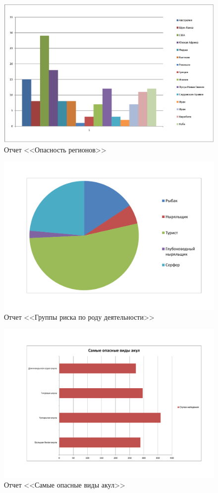 \documentclass[russian,utf8,simple,emptystyle]{eskdtext}
\begin{document}
\begin{figure}[ht]
\centering
\includegraphics[width=\textwidth, angle=90]{report1}
\caption{Отчет <<Опасность регионов>>}
\end{figure}

\begin{figure}[ht]
\centering
\includegraphics[width=\textwidth, angle=90]{report2}
\caption{Отчет <<Группы риска по роду деятельности>>}
\end{figure}

\begin{figure}[ht]
\centering
\includegraphics[width=\textwidth, angle=90]{report3}
\caption{Отчет <<Самые опасные виды акул>>}
\end{figure}
\end{document}
